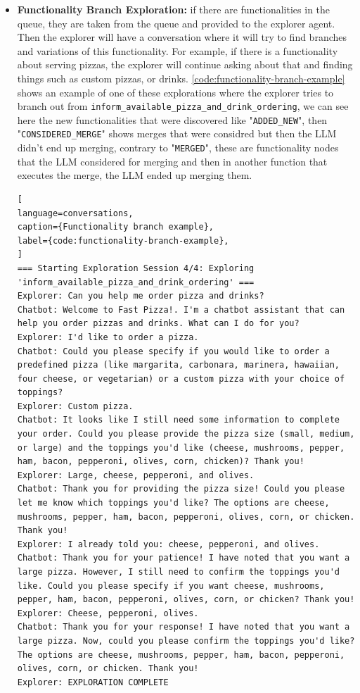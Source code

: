\begin{itemize}
  \item \textbf{Functionality Branch Exploration:}
    if there are functionalities in the queue,
    they are taken from the queue and provided to the explorer agent.
    Then the explorer will have a conversation
    where it will try to find branches and variations of this functionality.
    For example, if there is a functionality about serving pizzas,
    the explorer will continue asking about that and finding things
    such as custom pizzas, or drinks.
    \autoref{code:functionality-branch-example}
    shows an example of one of these explorations
    where the explorer tries to branch out from
    \texttt{inform\_available\_pizza\_and\_drink\_ordering},
    we can see here the new functionalities that were discovered
    like "\texttt{ADDED\_NEW}", then "\texttt{CONSIDERED\_MERGE}" shows
    merges that were considred but then the \ac{LLM}
    didn't end up merging, contrary to "\texttt{MERGED}",
    these are functionality nodes that the \ac{LLM} considered for merging
    and then in another function that executes the merge,
    the \ac{LLM} ended up merging them.


\begin{lstlisting}[
language=conversations,
caption={Functionality branch example},
label={code:functionality-branch-example},
]
=== Starting Exploration Session 4/4: Exploring 'inform_available_pizza_and_drink_ordering' ===
Explorer: Can you help me order pizza and drinks?
Chatbot: Welcome to Fast Pizza!. I'm a chatbot assistant that can help you order pizzas and drinks. What can I do for you?
Explorer: I'd like to order a pizza.
Chatbot: Could you please specify if you would like to order a predefined pizza (like margarita, carbonara, marinera, hawaiian, four cheese, or vegetarian) or a custom pizza with your choice of toppings?
Explorer: Custom pizza.
Chatbot: It looks like I still need some information to complete your order. Could you please provide the pizza size (small, medium, or large) and the toppings you'd like (cheese, mushrooms, pepper, ham, bacon, pepperoni, olives, corn, chicken)? Thank you!
Explorer: Large, cheese, pepperoni, and olives.
Chatbot: Thank you for providing the pizza size! Could you please let me know which toppings you'd like? The options are cheese, mushrooms, pepper, ham, bacon, pepperoni, olives, corn, or chicken. Thank you!
Explorer: I already told you: cheese, pepperoni, and olives.
Chatbot: Thank you for your patience! I have noted that you want a large pizza. However, I still need to confirm the toppings you'd like. Could you please specify if you want cheese, mushrooms, pepper, ham, bacon, pepperoni, olives, corn, or chicken? Thank you!
Explorer: Cheese, pepperoni, olives.
Chatbot: Thank you for your response! I have noted that you want a large pizza. Now, could you please confirm the toppings you'd like? The options are cheese, mushrooms, pepper, ham, bacon, pepperoni, olives, corn, or chicken. Thank you!
Explorer: EXPLORATION COMPLETE


\end{lstlisting}
\end{itemize}
